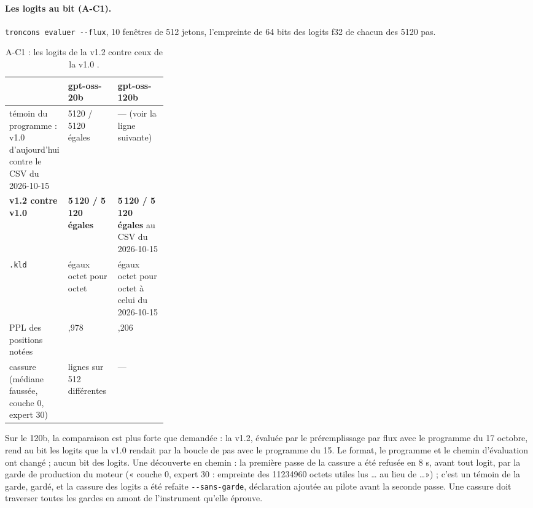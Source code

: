 \paragraph{Les logits au bit (A-C1).} \texttt{troncons evaluer -{}-flux}, 10 fenêtres de 512 jetons, l'empreinte de 64 bits des logits f32 de chacun des \num{5120} pas.

\begin{table}[ht]
\centering\small
\caption[A-C1 : les logits au bit]{A-C1 : les logits de la v1.2 contre ceux de la v1.0 \mes.}
\label{t3cod:tab:logits}
\begin{tabularx}{\linewidth}{@{}>{\raggedright\arraybackslash}p{0.3\linewidth}>{\raggedright\arraybackslash}X>{\raggedright\arraybackslash}X@{}}
\toprule
& gpt-oss-20b & gpt-oss-120b \\
\midrule
témoin du programme : v1.0 d'aujourd'hui contre le CSV du 2026-10-15 & \num{5120} / \num{5120} égales & --- (voir la ligne suivante) \\
\textbf{v1.2 contre v1.0} & \textbf{5\,120 / 5\,120 égales} & \textbf{5\,120 / 5\,120 égales} au CSV du 2026-10-15 \\
\texttt{.kld} & égaux octet pour octet & égaux octet pour octet à celui du 2026-10-15 \\
PPL des positions notées & 461,978 & 422,206 \\
cassure (médiane faussée, couche 0, expert 30) & 512 lignes sur 512 différentes & --- \\
\bottomrule
\end{tabularx}
\end{table}

Sur le 120b, la comparaison est plus forte que demandée : la v1.2, évaluée par le préremplissage par flux avec le programme du 17 octobre, rend au bit les logits que la v1.0 rendait par la boucle de pas avec le programme du 15. Le format, le programme et le chemin d'évaluation ont changé ; aucun bit des logits. Une découverte en chemin : la première passe de la cassure a été refusée en 8 s, avant tout logit, par la garde de production du moteur (« couche 0, expert 30 : empreinte des \num{11234960} octets utiles lus \dots{} au lieu de \dots ») ; c'est un témoin de la garde, gardé, et la cassure des logits a été refaite \texttt{-{}-sans-garde}, déclaration ajoutée au pilote avant la seconde passe. Une cassure doit traverser toutes les gardes en amont de l'instrument qu'elle éprouve.

